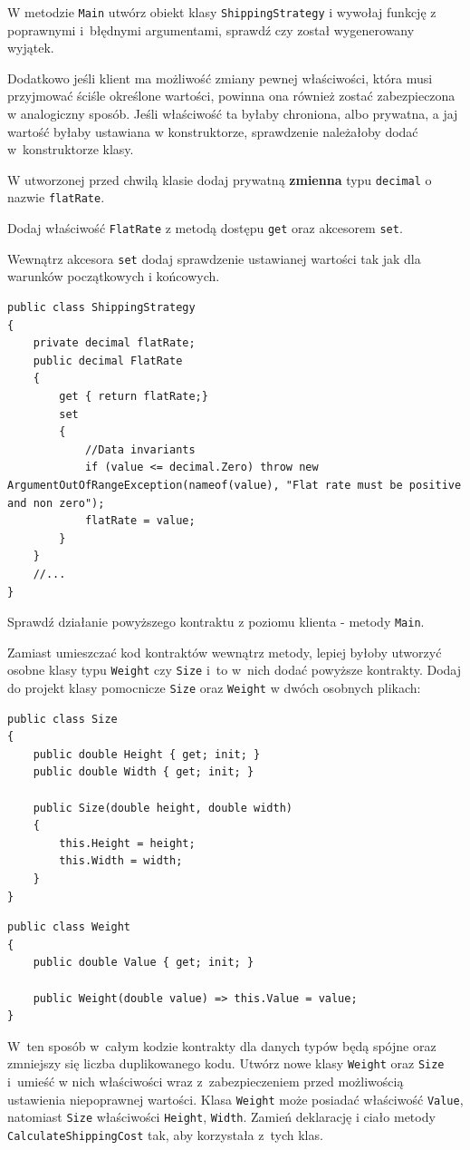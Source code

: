 W metodzie \texttt{Main} utwórz obiekt klasy \texttt{ShippingStrategy} i wywołaj funkcję z poprawnymi i~błędnymi argumentami, sprawdź czy został wygenerowany wyjątek.

Dodatkowo jeśli klient ma możliwość zmiany pewnej właściwości, która musi przyjmować ściśle określone wartości, powinna ona również zostać zabezpieczona w analogiczny sposób. Jeśli właściwość ta byłaby chroniona, albo prywatna, a jaj wartość byłaby ustawiana w konstruktorze, sprawdzenie należałoby dodać w~konstruktorze klasy.

W utworzonej przed chwilą klasie dodaj prywatną \textbf{zmienna} typu \texttt{decimal} o nazwie \texttt{flatRate}.

Dodaj właściwość \texttt{FlatRate} z metodą dostępu \texttt{get} oraz akcesorem \texttt{set}.

Wewnątrz akcesora \texttt{set} dodaj sprawdzenie ustawianej wartości tak jak dla warunków początkowych i końcowych.
\begin{lstlisting}
public class ShippingStrategy
{
	private decimal flatRate;
	public decimal FlatRate 
	{ 
		get { return flatRate;}
		set
		{
			//Data invariants
			if (value <= decimal.Zero) throw new ArgumentOutOfRangeException(nameof(value), "Flat rate must be positive and non zero");
			flatRate = value;
		}
	}
	//...
}
\end{lstlisting}
Sprawdź działanie powyższego kontraktu z poziomu klienta - metody \texttt{Main}.


Zamiast umieszczać kod kontraktów wewnątrz metody, lepiej byłoby utworzyć osobne klasy typu \texttt{Weight} czy \texttt{Size} i~to w~nich dodać powyższe kontrakty. Dodaj do projekt klasy pomocnicze \texttt{Size} oraz \texttt{Weight} w dwóch osobnych plikach:
\begin{lstlisting}
public class Size
{
	public double Height { get; init; }
	public double Width { get; init; }
	
	public Size(double height, double width)
	{
		this.Height = height;
		this.Width = width;
	}
}
\end{lstlisting}
\begin{lstlisting}
public class Weight
{
	public double Value { get; init; }
	
	public Weight(double value) => this.Value = value;
}
\end{lstlisting}

W~ten sposób w~całym kodzie kontrakty dla danych typów będą spójne oraz zmniejszy się liczba duplikowanego kodu. Utwórz nowe klasy \texttt{Weight} oraz \texttt{Size} i~umieść w nich właściwości wraz z~zabezpieczeniem przed możliwością ustawienia niepoprawnej wartości. Klasa \texttt{Weight} może posiadać właściwość \texttt{Value}, natomiast \texttt{Size} właściwości \texttt{Height}, \texttt{Width}. Zamień deklarację i ciało metody \texttt{CalculateShippingCost} tak, aby korzystała z~tych klas.


